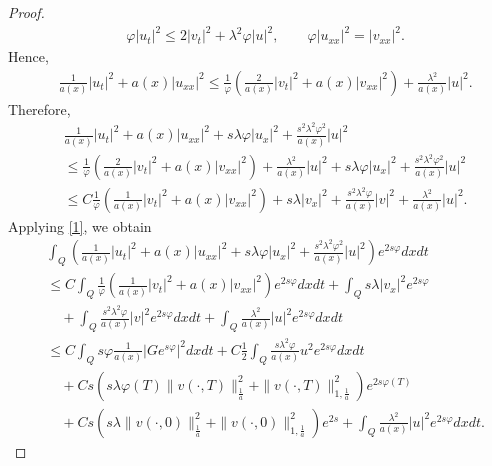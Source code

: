 \documentclass[reqno]{amsart}
\theoremstyle{plain}
\theoremstyle{remark}
\numberwithin{equation}{section}
\begin{document}
\begin{proof}
\begin{equation*}
\begin{aligned}
        &\varphi\vert u_{t}\vert^2 \leq 2\vert v_{t}\vert^2 +\lambda^2\varphi\vert u\vert^2,\qquad 
        \varphi \vert u_{xx}\vert^2 = \vert v_{xx}\vert^2.
    \end{aligned}
\end{equation*}
Hence, 
\begin{align*}
&\frac{1}{a(x)}\vert u_{t}\vert^2+ a(x)\vert u_{xx}\vert^2 \leqslant \frac{1}{\varphi}\left( \frac{2}{a(x)}\vert v_{t}\vert^2 +a(x)\vert v_{xx}\vert^2\right)+ \frac{\lambda^2}{a(x)}\vert u \vert^2.
\end{align*}
Therefore,
\begin{align*}
    &\frac{1}{a(x)}\vert u_{t}\vert^2+ a(x)\vert u_{xx}\vert^2+ s\lambda \varphi \vert u_{x}\vert^2+ \frac{s^2\lambda^2\varphi^2}{a(x)}\vert u\vert^2\\&
    \leqslant \frac{1}{\varphi}\left( \frac{2}{a(x)}\vert v_{t}\vert^2 +a(x)\vert v_{xx}\vert^2\right)+ \frac{\lambda^2}{a(x)}\vert u \vert^2 + s\lambda\varphi \vert u_{x}\vert^2+ \frac{s^2\lambda^2\varphi^2}{a(x)}\vert u\vert^2 \\ &\leqslant C\frac{1}{\varphi}\left( \frac{1}{a(x)}\vert v_{t}\vert^2 +a(x)\vert v_{xx}\vert^2\right)+ s\lambda \vert v_{x}\vert^2+ \frac{s^2\lambda^2\varphi}{a(x)}\vert v\vert^2+ \frac{\lambda^2}{a(x)}\vert u \vert^2 . 
\end{align*}
Applying \eqref{1}, we obtain
\begin{equation*}
    \begin{split}
        &\int_{Q} \left(\frac{1}{a(x)}\vert u_{t}\vert^2+ a(x)\vert u_{xx}\vert^2+ s\lambda \varphi \vert u_{x}\vert^2+ \frac{s^2\lambda^2\varphi^2}{a(x)}\vert u\vert^2\right)e^{2s\varphi}dxdt\\&
        \leqslant C\int_{Q}\frac{1}{\varphi}\left( \frac{1}{a(x)}\vert v_{t}\vert^2 +a(x)\vert v_{xx}\vert^2\right)e^{2s\varphi}dxdt+\int_{Q}s\lambda \vert v_{x}\vert^2e^{2s\varphi}\\ &\quad +\int_{Q} \frac{s^2\lambda^2\varphi}{a(x)}\vert v\vert^2 e^{2s\varphi} dxdt+ \int_{Q} \frac{\lambda^2}{a(x)}\vert u \vert^2 e^{2s\varphi} dxdt\\&\leqslant C  \int_{Q}s\varphi\frac{1}{a(x)}\vert Ge^{s\varphi}\vert^2 dxdt +C\frac{1}{2}\int_{Q}\frac{s\lambda^2\varphi}{a(x)}u^2 e^{2s\varphi}dxdt \\&\quad +C s\left( s\lambda\varphi(T)\| v(\cdot,T)\|_{\frac{1}{a}}^2+\| v(\cdot,T)\|_{1,\frac{1}{a}}^2 \right)e^{2s\varphi(T)}\\& \quad +Cs\left( s\lambda\| v(\cdot,0)\|_{\frac{1}{a}}^2+\| v(\cdot,0)\|_{1,\frac{1}{a}}^2\right)e^{2s}+\int_{Q} \frac{\lambda^2}{a(x)}\vert u \vert^2 e^{2s\varphi} dxdt.

\end{split}
\end{equation*}
\end{proof}
\end{document}
